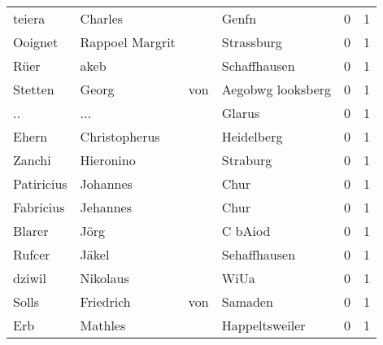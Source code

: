 \begin{tabular}{llllrr}
                   teiera &                            Charles &             &                                       Genfn &          0 &         1 \\
                  Ooignet &                    Rappoel Margrit &             &                                  Strassburg &          0 &         1 \\
                     Rüer &                               akeb &             &                                Schaffhausen &          0 &         1 \\
                  Stetten &                              Georg &         von &                           Aegobwg looksberg &          0 &         1 \\
                       .. &                                ... &             &                                      Glarus &          0 &         1 \\
                    Ehern &                      Christopherus &             &                                  Heidelberg &          0 &         1 \\
                   Zanchi &                          Hieronino &             &                                    Straburg &          0 &         1 \\
               Patiricius &                           Johannes &             &                                        Chur &          0 &         1 \\
                Fabricius &                           Jehannes &             &                                        Chur &          0 &         1 \\
                   Blarer &                               Jörg &             &                                     C bAiod &          0 &         1 \\
                   Rufcer &                              Jäkel &             &                                Sehaffhausen &          0 &         1 \\
                   dziwil &                           Nikolaus &             &                                        WiUa &          0 &         1 \\
                    Solls &                          Friedrich &         von &                                     Samaden &          0 &         1 \\
                      Erb &                            Mathles &             &                              Happeltsweiler &          0 &         1 \\

\end{tabular}
